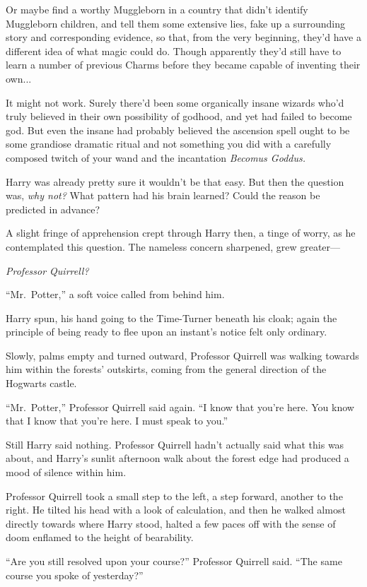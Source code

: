 Or maybe find a worthy Muggleborn in a country that didn’t identify Muggleborn children, and tell them some extensive lies, fake up a surrounding story and corresponding evidence, so that, from the very beginning, they’d have a different idea of what magic could do. Though apparently they’d still have to learn a number of previous Charms before they became capable of inventing their own...

It might not work. Surely there’d been some organically insane wizards who’d truly believed in their own possibility of godhood, and yet had failed to become god. But even the insane had probably believed the ascension spell ought to be some grandiose dramatic ritual and not something you did with a carefully composed twitch of your wand and the incantation \emph{Becomus Goddus.}

Harry was already pretty sure it wouldn’t be that easy. But then the question was, \emph{why not?} What pattern had his brain learned? Could the reason be predicted in advance?

A slight fringe of apprehension crept through Harry then, a tinge of worry, as he contemplated this question. The nameless concern sharpened, grew greater—

\emph{Professor Quirrell?}

“Mr.~Potter,” a soft voice called from behind him.

Harry spun, his hand going to the Time-Turner beneath his cloak; again the principle of being ready to flee upon an instant’s notice felt only ordinary.

Slowly, palms empty and turned outward, Professor Quirrell was walking towards him within the forests’ outskirts, coming from the general direction of the Hogwarts castle.

“Mr.~Potter,” Professor Quirrell said again. “I know that you’re here. You know that I know that you’re here. I must speak to you.”

Still Harry said nothing. Professor Quirrell hadn’t actually said what this was about, and Harry’s sunlit afternoon walk about the forest edge had produced a mood of silence within him.

Professor Quirrell took a small step to the left, a step forward, another to the right. He tilted his head with a look of calculation, and then he walked almost directly towards where Harry stood, halted a few paces off with the sense of doom enflamed to the height of bearability.

“Are you still resolved upon your course?” Professor Quirrell said. “The same course you spoke of yesterday?”

